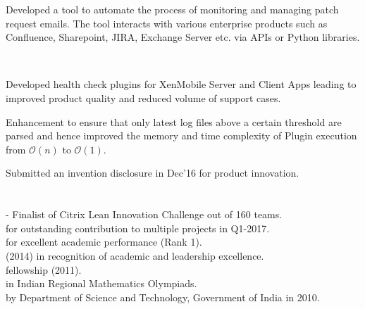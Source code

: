 \documentclass[]{deedy-resume-openfont}
\begin{document}
\begin{minipage}[t]{0.48\textwidth}
\begin{tightemize}
\item {} Developed a tool to automate the process of monitoring and managing patch request emails. The tool interacts with various enterprise products such as Confluence, Sharepoint, JIRA, Exchange Server etc. via APIs or Python libraries.
\vspace{1mm}
\item {} \\
\vspace{1mm}
\begin{tightemize}
 \item Developed health check plugins for XenMobile Server and Client Apps leading to improved product quality and reduced volume of support cases.
 \item Enhancement to ensure that only latest log files above a certain threshold are parsed and hence improved the memory and time complexity of Plugin execution from $\mathcal{O}(n)$ to $\mathcal{O}(1)$.
\end{tightemize}
\vspace{1mm}
\item Submitted an invention disclosure in Dec’16 for product innovation.
\end{tightemize}
\sectionsep




\section{}
\hline
\vspace{2mm}
\textbullet{}  - Finalist of Citrix Lean Innovation Challenge out of 160 teams.\\
\vspace{1mm}
\textbullet{}  for outstanding contribution to multiple projects in Q1-2017. \\
\vspace{1mm}
 \textbullet{}  for excellent academic performance (Rank 1). \\
 \vspace{1mm}
\textbullet{}  (2014) in recognition of academic and leadership excellence. \\
\vspace{1mm}
\textbullet{}  fellowship (2011). \\
\vspace{1mm}
\textbullet{}  in Indian Regional Mathematics Olympiads. \\
\vspace{1mm}
\textbullet{}  by Department of Science and Technology, Government of India in 2010.\\



\end{minipage}
\end{document}
